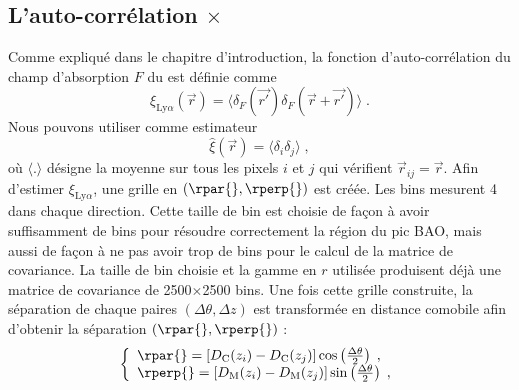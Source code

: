 \subsection{L'auto-corrélation \lya{}$\times$\lya{}}
\label{subsec:cf_estimateur}
Comme expliqué dans le chapitre d'introduction, la fonction d'auto-corrélation du champ d'absorption $F$ du \lya{} est définie comme
\begin{equation}
  \xi_{\mathrm{Ly}\alpha}(\vec r) = \langle \delta_F(\vec{r'}) \delta_F(\vec{r} + \vec{r'}) \rangle \; .
\end{equation}
Nous pouvons utiliser comme estimateur
\begin{equation}
 \hat \xi(\vec r) = \langle \delta_i \delta_j \rangle \; ,
\end{equation}
où $\langle .\rangle$ désigne la moyenne sur tous les pixels $i$ et $j$ qui vérifient $\vec r_{ij} = \vec r$.
Afin d'estimer $\xi_{\mathrm{Ly}\alpha}$, une grille en $(\rpar{}, \rperp{})$ est créée.
Les bins mesurent \SI{4}{\perh\Mpc} dans chaque direction.
Cette taille de bin est choisie de façon à avoir suffisamment de bins pour résoudre correctement la région du pic BAO, mais aussi de façon à ne pas avoir trop de bins pour le calcul de la matrice de covariance. La taille de bin choisie et la gamme en $r$ utilisée produisent déjà une matrice de covariance de \num{2500}$\times$\num{2500} bins.
Une fois cette grille construite, la séparation de chaque paires $(\Delta \theta, \Delta z)$ est transformée en distance comobile afin d'obtenir la séparation $(\rpar{}, \rperp{})$ :
\begin{equation}
  \left\{
    \begin{array}{l}
      \rpar{} = \left[D_{\mathrm{C}}(z_i) - D_{\mathrm{C}}(z_j)\right] \cos\left(\frac{\Delta \theta}{2}\right) \; , \\
      \rperp{} = \left[D_{\mathrm{M}}(z_i) - D_{\mathrm{M}}(z_j)\right] \sin\left(\frac{\Delta \theta}{2}\right) \; ,
    \end{array}
  \right. 
\end{equation}

